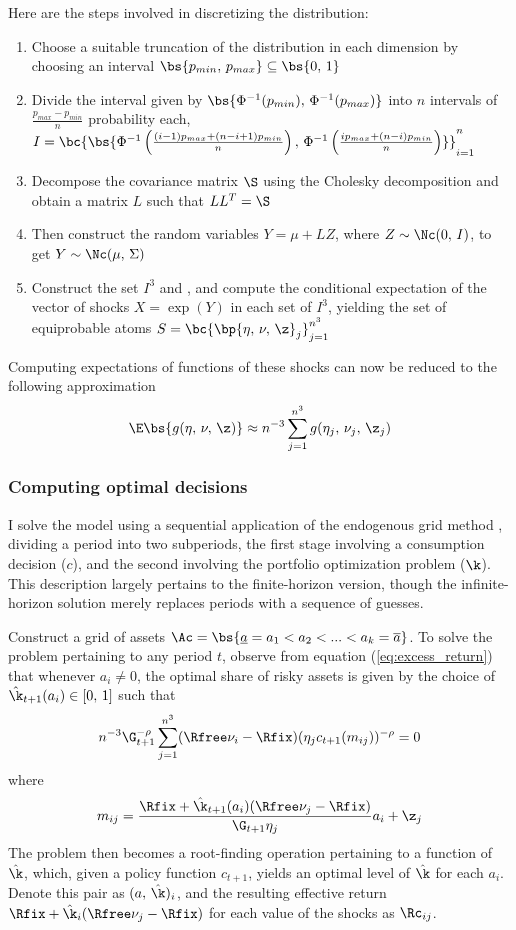 Here are the steps involved in discretizing the distribution:
\begin{enumerate}
    \item Choose a suitable truncation of the distribution in each dimension by choosing an interval $\bs{p_{min},\,p_{max}} \subseteq \bs{0,\,1}$
    \item Divide the interval given by $\bs{\Phi^{-1}(p_{min}),\,\Phi^{-1}(p_{max})}$ into $n$ intervals of $\frac{p_{max} - p_{min}}{n}$ probability each, $I = \bc{\bs{\Phi^{-1}\left(\frac{(i - 1)p_{max} + (n - i + 1)p_{min}}{n}\right),\,\Phi^{-1}\left(\frac{ip_{max} + (n - i)p_{min}}{n}\right)}}_{i=1}^{n}$
    \item Decompose the covariance matrix $\S$ using the Cholesky decomposition and obtain a matrix $L$ such that $LL^T = \S$
    \item Then construct the random variables $Y = \mu + LZ$, where $Z \sim \Nc(0,\,I)$, to get $Y \sim \Nc(\mu,\,\Sigma)$
    \item Construct the set $I^3$ and , and compute the conditional expectation of the vector of shocks $X = \exp(Y)$ in each set of $I^3$, yielding the set of equiprobable atoms $S = \bc{\bp{\eta,\,\nu,\,\z}_{j}}_{j=1}^{n^3}$
\end{enumerate}

Computing expectations of functions of these shocks can now be reduced to the following approximation
\[
\E\bs{g(\eta,\,\nu,\,\z)} \approx n^{-3}\sum_{j=1}^{n^3}g(\eta_j,\,\nu_j,\,\z_j)
\]

\subsubsection{Computing optimal decisions}

I solve the model using a sequential application of the endogenous grid method \citep{Carroll2006}, dividing a period into two subperiods, the first stage involving a consumption decision ($c$), and the second involving the portfolio optimization problem ($\k$). This description largely pertains to the finite-horizon version, though the infinite-horizon solution merely replaces periods with a sequence of guesses.

Construct a grid of assets $\Ac = \bs{\underline{a} = a_1 < a_2 < ... < a_k = \overline{a}}$. To solve the problem pertaining to any period $t$, observe from equation (\ref{eq:excess_return}) that whenever $a_i \neq 0$, the optimal share of risky assets is given by the choice of $\hat{\k}_{t+1}(a_i) \in [0,\,1]$ such that
\begin{equation}\label{eq:kappa}
n^{-3}\G_{t+1}^{-\rho}\sum_{j=1}^{n^3}(\Rfree\nu_i - \Rfix)(\eta_{j}c_{t+1}(m_{ij}))^{-\rho} = 0
\end{equation}
where
\[
m_{ij} = \frac{\Rfix + \hat{\k}_{t+1}(a_i)(\Rfree\nu_j - \Rfix)}{\G_{t+1}\eta_{j}}a_i + \z_j
\]
The problem then becomes a root-finding operation pertaining to a function of $\hat{\k}$, which, given a policy function $c_{t+1}$, yields an optimal level of $\hat{\k}$ for each $a_i$. Denote this pair as $(a,\,\hat{\k})_{i}$, and the resulting effective return $\Rfix + \hat{\k}_{i}(\Rfree\nu_{j} - \Rfix)$ for each value of the shocks as $\Rc_{ij}$.

